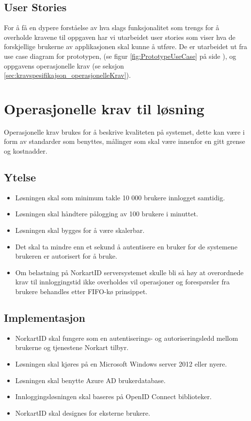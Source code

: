 \subsection{User Stories}
\label{subsec:kravspesifikasjonGammel_funksjonelleKrav_userStories}
For å få en dypere forståelse av hva slags funksjonalitet som trengs for å overholde kravene til oppgaven har vi utarbeidet user stories som viser hva de forskjellige brukerne av applikasjonen skal kunne å utføre. De er utarbeidet ut fra use case diagram for prototypen, (se figur \ref{fig:PrototypeUseCase} på side \pageref{fig:PrototypeUseCase}), og oppgavens operasjonelle krav (se seksjon \ref{sec:kravspesifikajson_operasjonelleKrav}).


\section{Operasjonelle krav til løsning}
\label{sec:kravspesifikasjonGammel_operasjonelleKrav}
Operasjonelle krav brukes for å beskrive kvaliteten på systemet, dette kan være i form av standarder som benyttes, målinger som skal være innenfor en gitt grense og kostnadder.

\subsection{Ytelse}
\label{subsec:kravspesifikasjonGammel_operasjonelleKrav_ytelse}
\begin{itemize}
\item Løsningen skal som minimum takle 10 000 brukere innlogget samtidig.
\item Løsningen skal håndtere pålogging av 100 brukere i minuttet.
\item Løsningen skal bygges for å være skalerbar.
\item Det skal ta mindre enn et sekund å autentisere en bruker for de systemene brukeren er autorisert for å bruke.
\item Om belastning på NorkartID serversystemet skulle bli så høy at overordnede krav til innloggingstid ikke overholdes vil operasjoner og forespørsler fra brukere behandles etter FIFO-kø prinsippet.
\end{itemize}

\subsection{Implementasjon}
\label{subsec:kravspesifikasjonGammel_operasjonelleKrav_implementasjon}
\begin{itemize}
\item NorkartID skal fungere som en autentiserings- og autoriseringsledd mellom brukerne og tjenestene Norkart tilbyr.
\item Løsningen skal kjøres på en Microsoft Windows server 2012 eller nyere.
\item Løsningen skal benytte Azure AD brukerdatabase.
\item Innloggingsløsningen skal baseres på OpenID Connect biblioteker.
\item NorkartID skal designes for eksterne brukere.
\end{itemize}

